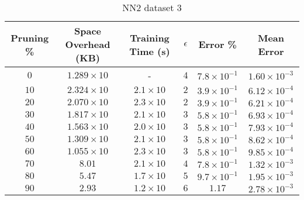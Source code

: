 \begin{adjustwidth}{0cm}{}
\begin{table}
\caption{NN2 dataset 3}\label{pr23}
\begin{tabular}{cccccc}
\hline
\toprule
Pruning \% & Space Overhead (KB) & Training Time (s) & $\epsilon$ & Error \% & Mean Error\\
\midrule
$0$ & $1.289 \times 10$ & - & $4$ & $7.8 \times 10^{-1}$ & $1.60 \times 10^{-3}$\\
$10$ & $2.324 \times 10$ & $2.1 \times 10$ & $2$ & $3.9 \times 10^{-1}$ & $6.12 \times 10^{-4}$\\
$20$ & $2.070 \times 10$ & $2.3 \times 10$ & $2$ & $3.9 \times 10^{-1}$ & $6.21 \times 10^{-4}$\\
$30$ & $1.817 \times 10$ & $2.1 \times 10$ & $3$ & $5.8 \times 10^{-1}$ & $6.93 \times 10^{-4}$\\
$40$ & $1.563 \times 10$ & $2.0 \times 10$ & $3$ & $5.8 \times 10^{-1}$ & $7.93 \times 10^{-4}$\\
$50$ & $1.309 \times 10$ & $2.1 \times 10$ & $3$ & $5.8 \times 10^{-1}$ & $8.62 \times 10^{-4}$\\
$60$ & $1.055 \times 10$ & $2.3 \times 10$ & $3$ & $5.8 \times 10^{-1}$ & $9.85 \times 10^{-4}$\\
$70$ & $8.01$ & $2.1 \times 10$ & $4$ & $7.8 \times 10^{-1}$ & $1.32 \times 10^{-3}$\\
$80$ & $5.47$ & $1.7 \times 10$ & $5$ & $9.7 \times 10^{-1}$ & $1.95 \times 10^{-3}$\\
$90$ & $2.93$ & $1.2 \times 10$ & $6$ & $1.17$ & $2.78 \times 10^{-3}$\\
\bottomrule
\end{tabular}
\end{table}
\end{adjustwidth}

